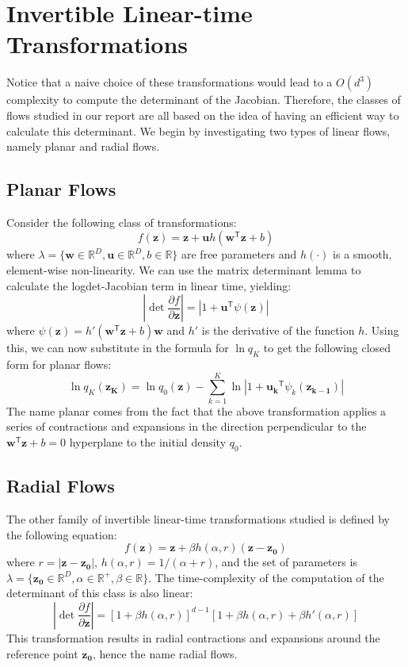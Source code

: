 \section{Invertible Linear-time Transformations}
Notice that a naive choice of these transformations would lead to a $O(d^3)$ complexity to compute the determinant of the Jacobian. Therefore, the classes of flows studied in our report are all based on the idea of having an efficient way to calculate this determinant. We begin by investigating two types of linear flows, namely planar and radial flows. 

\subsection{Planar Flows}
Consider the following class of transformations:
\[ f(\mathbf{z}) = \mathbf{z}+\mathbf{u}h(\mathbf{w}^\mathsf{T}\mathbf{z}+b) \]
where $\lambda = \{ \mathbf{w} \in \mathbb{R}^D, \mathbf{u} \in \mathbb{R}^D, b \in \mathbb{R} \}$ are free parameters and $h(\cdot)$ is a smooth, element-wise non-linearity. We can use the matrix determinant lemma to calculate the logdet-Jacobian term in linear time, yielding:
\[ \left| \det \frac{\partial f}{\partial \mathbf{z}} \right| = \left| 1+\mathbf{u}^\mathsf{T}\psi(\mathbf{z})\right| \]
where $\psi(\mathbf{z}) = h'(\mathbf{w}^\mathsf{T}\mathbf{z}+b)\mathbf{w}$ and $h'$ is the derivative of the function $h$. Using this, we can now substitute in the formula for $\ln q_K$ to get the following closed form for planar flows:
\[ \ln q_K (\mathbf{z_K}) = \ln q_0(\mathbf{z}) - \sum_{k=1}^K \ln \left| 1+\mathbf{u_k}^\mathsf{T}\psi_k(\mathbf{z_{k-1}})\right| \]
The name planar comes from the fact that the above transformation applies a series of contractions and expansions in the direction perpendicular to the $\mathbf{w}^\mathsf{T}\mathbf{z}+b = 0$ hyperplane to the initial density $q_0$.

\subsection{Radial Flows}
The other family of invertible linear-time transformations studied is defined by the following equation:
\[f(\mathbf{z}) = \mathbf{z} + \beta h(\alpha,r)(\mathbf{z}-\mathbf{z_0}) \]
where $r=\left| \mathbf{z}-\mathbf{z_0}\right|$, $h(\alpha,r) = 1/(\alpha+r)$, and the set of parameters is $\lambda = \{ \mathbf{z_0}\in \mathbb{R}^D, \alpha \in \mathbb{R} ^{+}, \beta \in \mathbb{R} \}$. The time-complexity of the computation of the determinant of this class is also linear:
\[ \left| \det \frac{\partial f}{\partial \mathbf{z}} \right| = [1+\beta h(\alpha ,r)]^{d-1}[1+\beta h(\alpha ,r)+\beta h'(\alpha ,r)] \] %
This transformation results in radial contractions and expansions around the reference point $\mathbf{z_0}$, hence the name radial flows.


